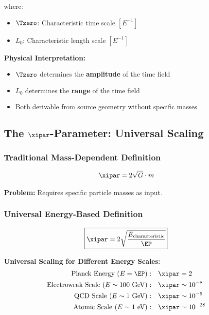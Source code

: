 	where:
	\begin{itemize}
		\item $\Tzero$: Characteristic time scale $[E^{-1}]$
		\item $L_0$: Characteristic length scale $[E^{-1}]$
	\end{itemize}
	
	\textbf{Physical Interpretation:}
	\begin{itemize}
		\item $\Tzero$ determines the \textbf{amplitude} of the time field
		\item $L_0$ determines the \textbf{range} of the time field
		\item Both derivable from source geometry without specific masses
	\end{itemize}
	
	\subsection{The $\xipar$-Parameter: Universal Scaling}
	\label{subsec:xi_elimination}
	
	\subsubsection{Traditional Mass-Dependent Definition}
	
	\begin{equation}
		\xipar = 2\sqrt{G} \cdot m
		\label{eq:xi_original}
	\end{equation}
	
	\textbf{Problem:} Requires specific particle masses as input.
	
	\subsubsection{Universal Energy-Based Definition}
	
	\begin{equation}
		\boxed{\xipar = 2\sqrt{\frac{E_{\text{characteristic}}}{\EP}}}
		\label{eq:xi_mass_free}
	\end{equation}
	
	\textbf{Universal Scaling for Different Energy Scales:}
	\begin{align}
		\text{Planck Energy } (E = \EP): \quad &\xipar = 2 \\
		\text{Electroweak Scale } (E \sim 100 \text{ GeV}): \quad &\xipar \sim 10^{-8} \\
		\text{QCD Scale } (E \sim 1 \text{ GeV}): \quad &\xipar \sim 10^{-9} \\
		\text{Atomic Scale } (E \sim 1 \text{ eV}): \quad &\xipar \sim 10^{-28}
	\end{align}
	
